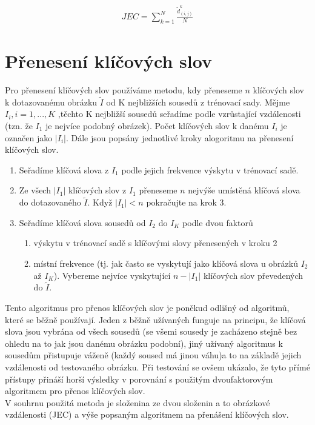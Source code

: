 \documentclass[czech,BP]{thesiskiv}
\begin{document}
\begin{align}
   \label{jec} JEC = \sum_{k=1}^N\frac{\tilde{d}_{(i,j)}^k}{N}
\end{align}

\section{Přenesení klíčových slov}
Pro přenesení klíčových slov používáme metodu, kdy přeneseme $n$ klíčových slov k dotazovanému obrázku $\tilde{I}$ od K nejbližších sousedů z trénovací sady. Mějme $I_{i}, i = 1, ..., K$ ,těchto K nejbližší sousedů seřadíme podle vzrůstající vzdálenosti (tzn. že $I_{1} $ je nejvíce podobný obrázek). Počet klíčových slov k danému $I_{i}$ je označen jako $|I_{i}|$. Dále jsou popsány jednotlivé kroky alogoritmu na přenesení klíčových slov.
\begin{enumerate}
	\item Seřadíme klíčová slova z $I_{1}$ podle jejich frekvence výskytu v trénovací sadě.
	\item Ze všech $|I_{1}|$ klíčových slov z $I_{1}$ přeneseme $n$ nejvýše umístěná klíčová slova do dotazovaného $\tilde{I}$. Když $|I_{1}| < n$ pokračujte na krok 3. 
	\item Seřadíme klíčová slova sousedů od $I_{2}$ do $I_{K}$ podle dvou faktorů
	\begin{enumerate}
		\item výskytu v trénovací sadě s klíčovými slovy přenesených v kroku 2
		\item místní frekvence (tj. jak často se vyskytují jako klíčová slova u obrázků $I_{2}$ až $I_{K}$). Vybereme nejvíce vyskytující $n-|I_{1}|$ klíčových slov převedených do $\tilde{I}$.
	\end{enumerate}
\end{enumerate}

Tento algoritmus pro přenos klíčových slov je poněkud odlišný od algoritmů, které se běžně používají. Jeden z běžně užívaných funguje na principu, že klíčová slova jsou vybrána od všech sousedů (se všemi sousedy je zacházeno stejně bez ohledu na to jak jsou danému obrázku podobní), jiný užívaný algoritmus k sousedům přistupuje váženě (každý soused má jinou váhu)a to na základě jejich vzdálenosti od testovaného obrázku. Při testování se ovšem ukázalo, že tyto přímé přístupy přináší horší výsledky v porovnání s použitým dvoufaktorovým algoritmem pro přenos klíčových slov. \\
V souhrnu použitá metoda je složenina ze dvou složenin a to obrázkové vzdálenosti (JEC) a výše popsaným algoritmem na přenášení klíčových slov.
\end{document}
